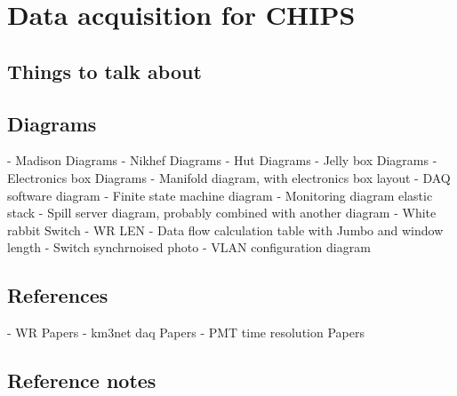 \chapter{Data acquisition for CHIPS}
\label{chap:daq}


\section{Things to talk about}


\section{Diagrams}

- Madison Diagrams
- Nikhef Diagrams
- Hut Diagrams
- Jelly box Diagrams
- Electronics box Diagrams
- Manifold diagram, with electronics box layout
- DAQ software diagram
- Finite state machine diagram
- Monitoring diagram elastic stack
- Spill server diagram, probably combined with another diagram
- White rabbit Switch
- WR LEN
- Data flow calculation table with Jumbo and window length
- Switch synchrnoised photo
- VLAN configuration diagram

\section{References}

- WR Papers
- km3net daq Papers
- PMT time resolution Papers

\section{Reference notes}